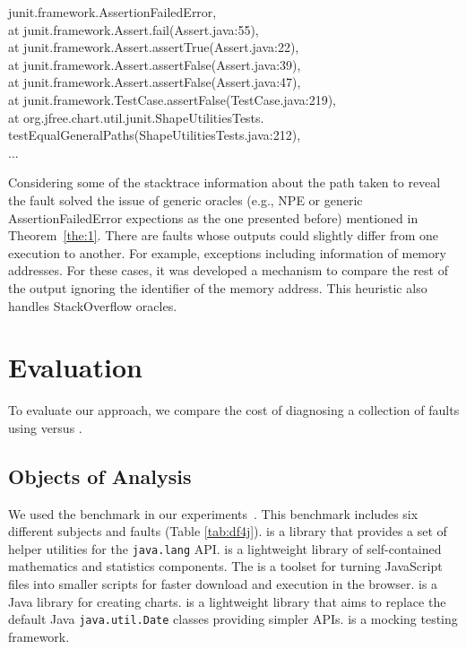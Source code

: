 \documentclass{article}
\begin{document}
\vspace{3mm}
\begin{myframe} \label{box:1}
junit.framework.AssertionFailedError, \\
at junit.framework.Assert.fail(Assert.java:55), \\
at junit.framework.Assert.assertTrue(Assert.java:22), \\
at junit.framework.Assert.assertFalse(Assert.java:39), \\
at junit.framework.Assert.assertFalse(Assert.java:47), \\
at junit.framework.TestCase.assertFalse(TestCase.java:219), \\
at org.jfree.chart.util.junit.ShapeUtilitiesTests.\\testEqualGeneralPaths(ShapeUtilitiesTests.java:212), \\
...
\end{myframe}

Considering some of the stacktrace information about the path taken to reveal
the fault solved the issue of generic oracles (e.g., NPE or generic
AssertionFailedError expections as the one presented before) mentioned in
Theorem~\ref{the:1}. There are faults whose outputs could slightly differ from
one execution to another. For example, exceptions including information of
memory addresses. For these cases, it was developed a mechanism to compare the
rest of the output ignoring the identifier of the memory address. This heuristic
also handles StackOverflow oracles.
%
\section{Evaluation}
\label{sec:eval}
%
To evaluate our approach, we compare the cost of diagnosing
a collection of faults using \sfl{} versus \comb{}.
%
\subsection{Objects of Analysis}\label{sec:analysis}

We used the \dfj{} benchmark in our experiments~\cite{just-defects4j-issta2014}.
This benchmark includes six different subjects and \numFaults{} faults (Table
\ref{tab:df4j}). \lang{} is a library that provides a set of helper utilities
for the {\small\texttt{java.lang}} API. \cmath{} is a lightweight library of
self-contained mathematics and statistics components. The \closure{} is a
toolset for turning JavaScript files into smaller scripts for faster download
and execution in the browser. \chart{} is a Java library for creating charts.
\jtime{} is a lightweight library that aims to replace the default Java
{\small\texttt{java.util.Date}} classes providing simpler APIs. \mockito{} is a
mocking testing framework.
\end{document}
